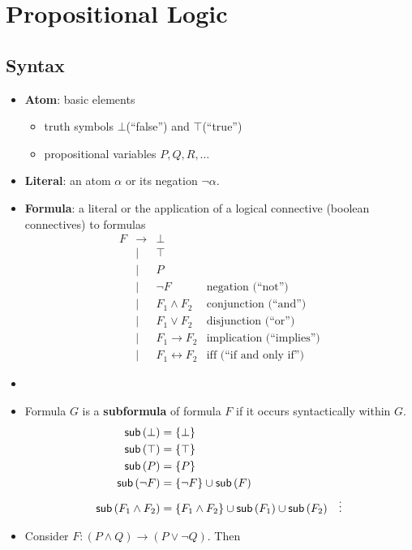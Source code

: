 
\section{Propositional Logic}

\subsection{Syntax}
\begin{itemize}
	\item \textbf{Atom}: basic elements
	\begin{itemize}
		\item truth symbols $\bot$(``false'') and $\top$(``true'')
		\item propositional variables $P,Q,R,\dots$
	\end{itemize}
	\item \textbf{Literal}: an atom $\alpha$ or its negation $\lnot\alpha$.
	\item \textbf{Formula}: a literal or the application of a logical connective (boolean connectives) to formulas
	\[
	\begin{array}{ccll}
		F & \to & \bot \\
		& | & \top \\
		& | & P \\
		& | & \lnot F & \text{negation (``not'')} \\
		& | & F_1\land F_2 & \text{conjunction (``and'')} \\
		& | & F_1\lor F_2 & \text{disjunction (``or'')} \\
		& | & F_1\to F_2 & \text{implication (``implies'')} \\
		& | & F_1\leftrightarrow F_2 & \text{iff (``if and only if'')}
	\end{array}
	\]
	\item[]
	\item Formula $G$ is a \textbf{subformula} of formula $F$ if it occurs syntactically within $G$.
	\begin{align*}
		\textsf{sub}\left(\bot\right) &= \set{\bot} \\
		\textsf{sub}\left(\top\right) &= \set{\top} \\
		\textsf{sub}\left(P\right) &= \set{P} \\
		\textsf{sub}\left(\lnot F\right) &= \set{\lnot F}\cup\textsf{sub}\left(F\right) \\
		\textsf{sub}\left(F_1\land F_2\right) &= \set{F_1\land F_2}\cup\textsf{sub}\left(F_1\right)\cup\textsf{sub}\left(F_2\right)
		&\vdots
	\end{align*}
	\item Consider $F:(P\land Q)\to (P\lor\lnot Q)$. Then \[
\]
\end{itemize}
